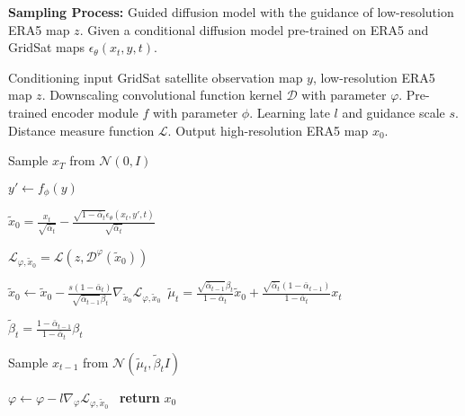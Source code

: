 \begin{algorithm}[t]\small
\renewcommand{\algorithmicrequire}{\textbf{Input:}}
\renewcommand{\algorithmicensure}{\textbf{Output:}}
\caption{\textbf{Sampling Process:} Guided diffusion model with the guidance of low-resolution ERA5 map $z$. Given a conditional diffusion model pre-trained on ERA5 and GridSat maps $\epsilon_\theta(x_t,y,t)$. }
\label{alg.2}
\begin{algorithmic}[1]
\REQUIRE Conditioning input GridSat satellite observation map $y$, low-resolution ERA5 map $z$. Downscaling convolutional function kernel $\mathcal{D}$ with parameter $\varphi$. Pre-trained encoder module $f$ with parameter $\phi$. Learning late $l$ and guidance scale $s$. Distance measure function $\mathcal{L}$. 
\ENSURE Output high-resolution ERA5 map $x_0$. 

\STATE Sample $x_T$ from $\mathcal{N}(0,I)$

\STATE $y' \gets f_\phi(y)$

        \STATE $\tilde{x} _0=\frac{x_t}{\sqrt{\bar{\alpha}_t }}-\frac{\sqrt{1-\bar{\alpha}_t}\epsilon_\theta(x_t,y',t)}{\sqrt{\bar{\alpha}_t }}$\
        
        \STATE $\mathcal{L}_{\varphi,\tilde{x}_0} =\mathcal{L}(z,\mathcal{D}^{\varphi}(\tilde{x}_0))$\

        \STATE $\tilde{x}_0 \gets \tilde{x}_0-\frac{s(1-\bar{\alpha}_t) }{\sqrt{\bar{\alpha}_{t-1}}\beta_t}\nabla_{{\tilde{x}}_0}\mathcal{L}_{\varphi,\tilde{x}_0}$\
        \STATE $\tilde{\mu}_t=\frac{\sqrt{\bar{\alpha}_{t-1}}\beta_t}{1-\bar{\alpha}_t}\tilde{x}_0+\frac{\sqrt{\bar{\alpha}_{t}}(1-\bar{\alpha}_{t-1})}{1-\bar{\alpha}_t}{x}_t$\

        \STATE $\tilde{\beta}_t=\frac{1-\bar{\alpha}_{t-1}}{1-\bar{\alpha}_t}\beta_t$\
        
        \STATE Sample $x_{t-1}$ from $\mathcal{N}(\tilde{\mu}_t,\tilde{\beta}_tI)$\

        \STATE $\varphi \gets \varphi-l\nabla_{\varphi}\mathcal{L}_{\varphi,\tilde{x}_0}$\
    \ENDFOR
\STATE \textbf{return}  $x_0$
    \end{algorithmic}
\end{algorithm}